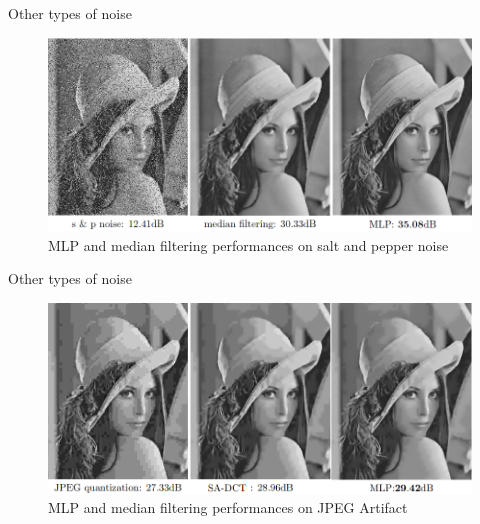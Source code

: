 \documentclass[8pt]{beamer}
\begin{document}
\begin{frame}{Other types of noise}
\begin{figure}[H]
    \begin{center}
        \includegraphics[scale=0.45]{../datasets/images/saltandpeppernoise.png}
        \caption{MLP and median filtering performances on salt and pepper noise}
    \end{center}
\end{figure}

\end{frame}

\begin{frame}{Other types of noise}

    \begin{figure}[H]
        \begin{center}
            \includegraphics[scale=0.45]{../datasets/images/Jpgegnoise.png}
            \caption{MLP and median filtering performances on JPEG Artifact}
        \end{center}
    \end{figure}
    
\end{frame}
\end{document}

